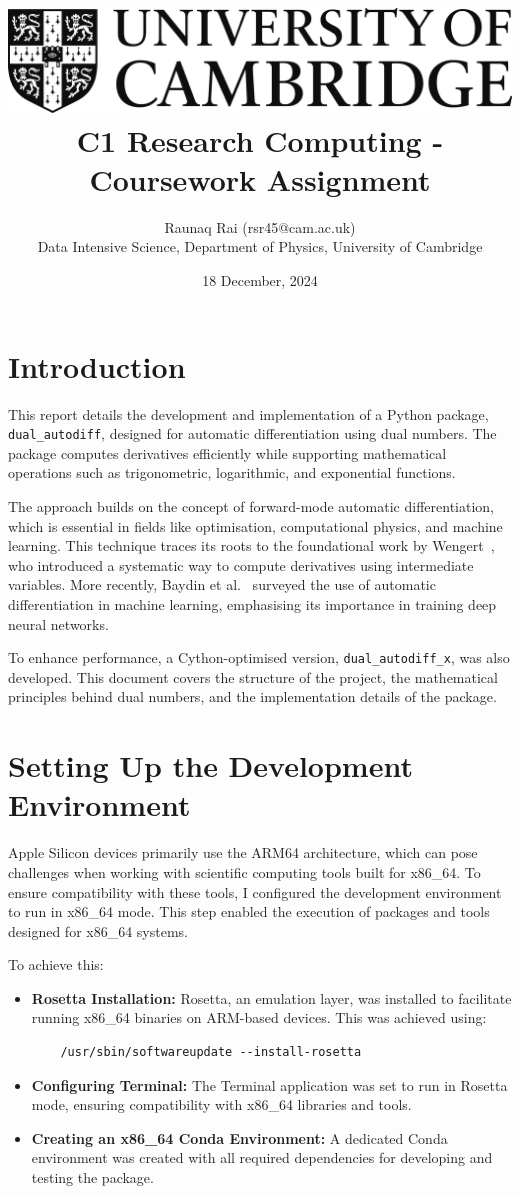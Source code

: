 \documentclass[a4paper,12pt]{article}
\title{
    \includegraphics[scale=0.4]{Cam_logo_bw.png}\\
    \vspace{0.5cm}
    C1 Research Computing - Coursework Assignment
}
\author{Raunaq Rai (rsr45@cam.ac.uk)\\
    Data Intensive Science, Department of Physics, University of Cambridge
}
\date{18 December, 2024}
\begin{document}
\maketitle

\section{Introduction}
This report details the development and implementation of a Python package, \texttt{dual\_autodiff}, designed for automatic differentiation using dual numbers. The package computes derivatives efficiently while supporting mathematical operations such as trigonometric, logarithmic, and exponential functions.

The approach builds on the concept of forward-mode automatic differentiation, which is essential in fields like optimisation, computational physics, and machine learning. This technique traces its roots to the foundational work by Wengert~\cite{wengert1964automatic}, who introduced a systematic way to compute derivatives using intermediate variables. More recently, Baydin et al.~\cite{baydin2018automatic} surveyed the use of automatic differentiation in machine learning, emphasising its importance in training deep neural networks.

To enhance performance, a Cython-optimised version, \texttt{dual\_autodiff\_x}, was also developed. This document covers the structure of the project, the mathematical principles behind dual numbers, and the implementation details of the package.

\section{Setting Up the Development Environment}

Apple Silicon devices primarily use the ARM64 architecture, which can pose challenges when working with scientific computing tools built for x86\_64. To ensure compatibility with these tools, I configured the development environment to run in x86\_64 mode. This step enabled the execution of packages and tools designed for x86\_64 systems.

To achieve this:
\begin{itemize}
    \item \textbf{Rosetta Installation:} Rosetta, an emulation layer, was installed to facilitate running x86\_64 binaries on ARM-based devices. This was achieved using:
    \begin{verbatim}
    /usr/sbin/softwareupdate --install-rosetta
    \end{verbatim}
    \item \textbf{Configuring Terminal:} The Terminal application was set to run in Rosetta mode, ensuring compatibility with x86\_64 libraries and tools.
    \item \textbf{Creating an x86\_64 Conda Environment:} A dedicated Conda environment was created with all required dependencies for developing and testing the package.
\end{itemize}
\end{document}
